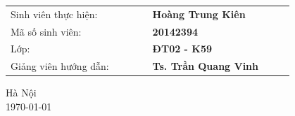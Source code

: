 \documentclass[12pt,a4paper]{article}
\begin{document}
\begin{table}[!htp]
    \centering
    \begin{tabular}{ m{0.4\linewidth} m{0.4\linewidth}}    
    	 Sinh viên thực hiện: & \textbf{Hoàng Trung Kiên} \\[9pt]
    	 Mã số sinh viên: & \textbf{20142394} \\[9pt]
    	 Lớp: & \textbf{ĐT02 - K59} \\[9pt]
    	 Giảng viên hướng dẫn: & \textbf{Ts. Trần Quang Vinh} \\
    \end{tabular}
\end{table}


\vspace{2cm}
\begin{center}
{\fontsize{16pt}{1}\selectfont Hà Nội}\\
{\fontsize{16pt}{1}\selectfont \today}
\end{center}
\end{document}
